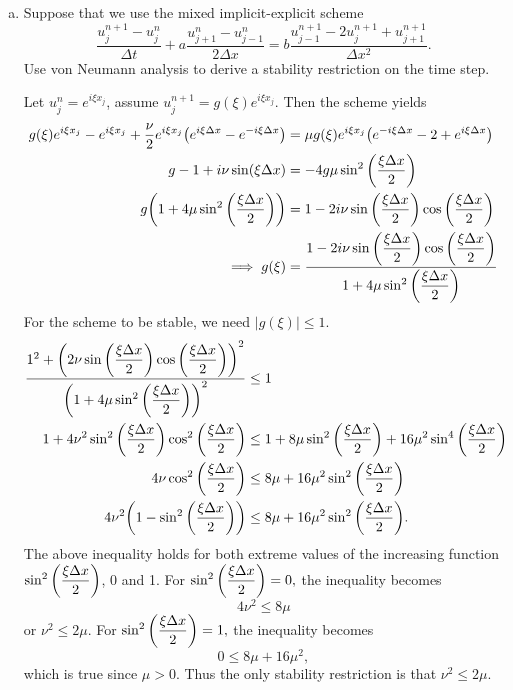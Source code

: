 \documentclass[12pt]{article}
\begin{document}
\begin{enumerate}[(a)]
\item Suppose that we use the mixed implicit-explicit scheme
$$\dfrac{u_j^{n+1}-u_j^n}{\Delta t} + a \dfrac{u_{j+1}^n - u_{j-1}^n}{2\Delta x} = b \dfrac{u_{j-1}^{n+1} - 2u_j^{n+1} + u_{j+1}^{n+1}}{\Delta x^2}.$$
Use von Neumann analysis to derive a stability restriction on the time step.

Let $u_j^n = e^{i\xi x_j}$, assume $u_j^{n+1}=g(\xi)e^{i\xi x_j}$.  Then the scheme yields
\begin{align*}
g(\xi)e^{i\xi x_j} - e^{i\xi x_j} + \dfrac{\nu}{2}e^{i\xi x_j}\qty(e^{i\xi\Delta x}-e^{-i\xi \Delta x}) &= \mu g(\xi) e^{i\xi x_j}\qty(e^{-i\xi\Delta x} - 2 + e^{i\xi \Delta x}) \\
g - 1 + i\nu\sin(\xi \Delta x) &= -4 g \mu \sin^2\qty(\dfrac{\xi \Delta x}{2}) \\
g\qty(1+4\mu\sin^2\qty(\dfrac{\xi\Delta x}{2})) &= 1 - 2i\nu\sin\qty(\dfrac{\xi\Delta x}{2})\cos\qty(\dfrac{\xi\Delta x}{2}) \\
\implies g(\xi) &= \dfrac{1 - 2i\nu\sin\qty(\dfrac{\xi\Delta x}{2})\cos\qty(\dfrac{\xi\Delta x}{2}) }{1+4\mu\sin^2\qty(\dfrac{\xi\Delta x}{2})}
\end{align*}
For the scheme to be stable, we need $|g(\xi)|\leq 1$.
\begin{align*}
\dfrac{1^2 + \qty(2\nu\sin\qty(\dfrac{\xi\Delta x}{2})\cos\qty(\dfrac{\xi\Delta x}{2}))^2}{\qty(1+4\mu\sin^2\qty(\dfrac{\xi\Delta x}{2}))^2} &\leq 1 \\
1 + 4\nu^2\sin^2\qty(\dfrac{\xi\Delta x}{2})\cos^2\qty(\dfrac{\xi\Delta x}{2}) &\leq 1 + 8\mu\sin^2\qty(\dfrac{\xi \Delta x}{2}) + 16\mu^2\sin^4\qty(\dfrac{\xi\Delta x}{2}) \\
4\nu\cos^2\qty(\dfrac{\xi\Delta x}{2}) &\leq 8\mu + 16\mu^2\sin^2\qty(\dfrac{\xi\Delta x}{2}) \\
4\nu^2\qty(1-\sin^2\qty(\dfrac{\xi\Delta x}{2})) &\leq 8\mu + 16\mu^2\sin^2\qty(\dfrac{\xi\Delta x}{2}). 
\end{align*}
The above inequality holds for both extreme values of the increasing function $\sin^2\qty(\dfrac{\xi\Delta x}{2})$, 0 and 1.  For $\sin^2\qty(\dfrac{\xi\Delta x}{2})=0,$ the inequality becomes $$4\nu^2 \leq 8 \mu$$
or $\nu^2 \leq 2\mu$.  For $\sin^2\qty(\dfrac{\xi\Delta x}{2})=1,$ the inequality becomes $$0 \leq 8\mu + 16\mu^2,$$ which is true since $\mu>0$.
Thus the only stability restriction is that $\nu^2 \leq 2\mu$.
\end{enumerate}
\end{document}
